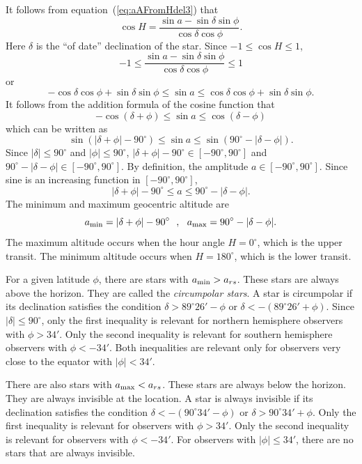 \documentclass[12pt]{article}
\newcommand \beq {\begin{equation}}
\newcommand \eeq {\end{equation}}
\begin{document}
It follows from equation~(\ref{eq:aAFromHdel3}) that 
\beq
  \cos H = \frac{\sin a - \sin \delta \sin \phi}{\cos \delta \cos \phi} .
\label{eq:cosH}
\eeq
Here $\delta$ is the ``of date'' declination of the star. 
Since $-1 \leq \cos H \leq 1$, 
\beq
  -1 \leq \frac{\sin a - \sin \delta \sin \phi}{\cos \delta \cos \phi} \leq 1
\eeq
or 
\beq
  -\cos \delta \cos \phi + \sin \delta \sin \phi \leq \sin a \leq 
  \cos \delta \cos \phi + \sin \delta \sin \phi .
\eeq
It follows from the addition formula of the cosine function that 
\beq
  -\cos (\delta + \phi)  \leq \sin a \leq \cos (\delta - \phi) 
\eeq
which can be written as 
\beq
  \sin (|\delta + \phi| - 90^\circ) \leq \sin a \leq \sin (90^\circ - |\delta -\phi|) .
\eeq
Since $|\delta|\leq 90^\circ$ and $|\phi| \leq 90^\circ$, 
$|\delta + \phi| - 90^\circ \in [-90^\circ, 90^\circ]$ and 
$90^\circ - |\delta -\phi| \in [-90^\circ, 90^\circ]$. By definition, the 
amplitude $a \in [-90^\circ, 90^\circ]$. Since sine is an increasing function 
in $[-90^\circ, 90^\circ]$, 
\beq
  |\delta + \phi| - 90^\circ \leq a \leq 90^\circ - |\delta -\phi| .
\eeq
The minimum and maximum geocentric altitude are 
\beq
  a_{\rm min} = |\delta + \phi| - 90^\circ \ \ , \ \ 
  a_{\rm max} = 90^\circ - |\delta -\phi| .
\eeq
The maximum altitude occurs when the hour angle $H=0^\circ$, which is the upper transit.
The minimum altitude occurs when $H=180^\circ$, which is the lower transit.

For a given latitude $\phi$, there are stars with $a_{\rm min} > a_{rs}$. 
These stars are always above the horizon. They are called the {\em circumpolar stars}. 
A star is circumpolar if its declination satisfies the condition 
$\delta > 89^\circ 26' - \phi$ or $\delta < -(89^\circ 26' + \phi)$. 
Since $|\delta|\leq 90^\circ$, only the first inequality is relevant for 
northern hemisphere observers with $\phi > 34'$. Only the second inequality 
is relevant for southern hemisphere observers with $\phi < -34'$. Both inequalities 
are relevant only for observers very close to the equator with $|\phi|<34'$.

There are also stars with $a_{\rm max} < a_{rs}$. These stars are always 
below the horizon. They are always invisible at the location. A star is always 
invisible if its declination satisfies the condition $\delta < -(90^\circ 34' - \phi)$ 
or $\delta > 90^\circ 34' + \phi$. Only the first inequality is relevant 
for observers with $\phi > 34'$. Only the second inequality 
is relevant for observers with $\phi < -34'$. For observers
with $|\phi| \leq 34'$, there are no stars that are always invisible.
\end{document}
